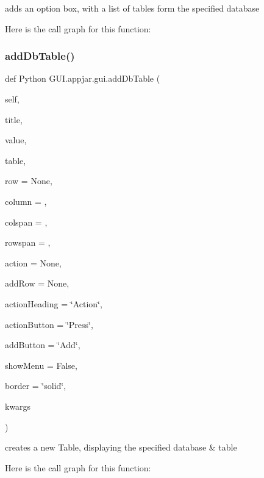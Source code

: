 \begin{DoxyVerb}adds an option box, with a list of tables form the specified database \end{DoxyVerb}
 Here is the call graph for this function\+:
\mbox{\label{class_python_01_g_u_i_1_1appjar_1_1gui_af64997bd78a9608cb2b4965fc29d1506}} 
\subsubsection{\texorpdfstring{add\+Db\+Table()}{addDbTable()}}
{\footnotesize\ttfamily def Python G\+U\+I.\+appjar.\+gui.\+add\+Db\+Table (\begin{DoxyParamCaption}\item[{}]{self,  }\item[{}]{title,  }\item[{}]{value,  }\item[{}]{table,  }\item[{}]{row = {\ttfamily None},  }\item[{}]{column = {},  }\item[{}]{colspan = {},  }\item[{}]{rowspan = {},  }\item[{}]{action = {\ttfamily None},  }\item[{}]{add\+Row = {\ttfamily None},  }\item[{}]{action\+Heading = {\ttfamily \char`\"{}Action\char`\"{}},  }\item[{}]{action\+Button = {\ttfamily \char`\"{}Press\char`\"{}},  }\item[{}]{add\+Button = {\ttfamily \char`\"{}Add\char`\"{}},  }\item[{}]{show\+Menu = {\ttfamily False},  }\item[{}]{border = {\ttfamily \char`\"{}solid\char`\"{}},  }\item[{}]{kwargs }\end{DoxyParamCaption})}

\begin{DoxyVerb}creates a new Table, displaying the specified database & table \end{DoxyVerb}
 Here is the call graph for this function\+:
\mbox{\label{class_python_01_g_u_i_1_1appjar_1_1gui_a108b3e754e0c227a7041d756b4fea3c6}} 
